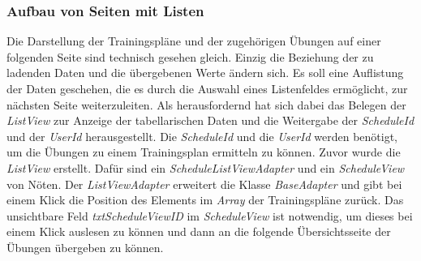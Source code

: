 \subsubsection*{Aufbau von Seiten mit Listen}
Die Darstellung der Trainingspläne und der zugehörigen Übungen auf einer folgenden Seite sind technisch gesehen gleich. Einzig die Beziehung der zu ladenden Daten und die übergebenen Werte ändern sich. Es soll eine Auflistung der Daten geschehen, die es durch die Auswahl eines Listenfeldes ermöglicht, zur nächsten Seite weiterzuleiten. Als herausfordernd hat sich dabei das Belegen der \textit{ListView} zur Anzeige der tabellarischen Daten und die Weitergabe der \textit{ScheduleId} und der \textit{UserId} herausgestellt. Die \textit{ScheduleId} und die \textit{UserId} werden benötigt, um die Übungen zu einem Trainingsplan ermitteln zu können. Zuvor wurde die \textit{ListView} erstellt. Dafür sind ein \textit{ScheduleListViewAdapter} und ein \textit{ScheduleView} von Nöten. Der \textit{ListViewAdapter} erweitert die Klasse \textit{BaseAdapter} und gibt bei einem Klick die Position des Elements im \textit{Array} der Trainingspläne zurück. Das unsichtbare Feld \textit{txtScheduleViewID} im \textit{ScheduleView} ist notwendig, um dieses bei einem Klick auslesen zu können und dann an die folgende Übersichtsseite der Übungen übergeben zu können.\\

